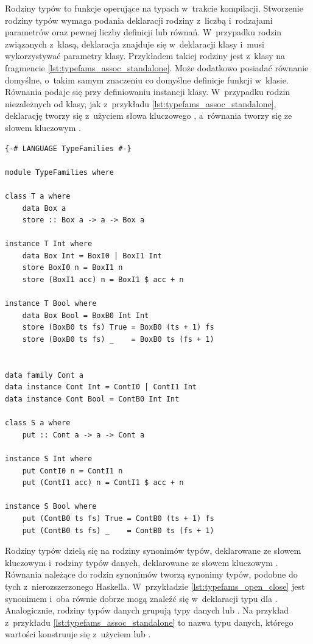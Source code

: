 \label{sec:rodziny_typow}

Rodziny typów to funkcje operujące na typach w~trakcie kompilacji.
Stworzenie rodziny typów wymaga podania deklaracji rodziny z~liczbą i~rodzajami
parametrów oraz pewnej liczby definicji lub równań. W~przypadku rodzin związanych
z~klasą, deklaracja znajduje się w~deklaracji klasy i~musi wykorzystywać parametry
klasy. Przykładem takiej rodziny jest  z~klasy  na
fragmencie \ref{lst:typefams_assoc_standalone}. Może dodatkowo
posiadać równanie domyślne, o~takim samym znaczeniu co domyślne definicje
funkcji w~klasie. Równania podaje się przy definiowaniu instancji klasy.
W~przypadku rodzin niezależnych od klasy, jak  z~przykładu
\ref{lst:typefams_assoc_standalone}, deklarację tworzy się z~użyciem słowa
kluczowego , a~równania tworzy się ze słowem kluczowym .

\begin{lstlisting}[float,label={lst:typefams_assoc_standalone},
                   caption={Przykład pozwiązanej z klasą i niezależnej rodziny typów.}]
{-# LANGUAGE TypeFamilies #-}

module TypeFamilies where

class T a where
    data Box a
    store :: Box a -> a -> Box a

instance T Int where
    data Box Int = BoxI0 | BoxI1 Int
    store BoxI0 n = BoxI1 n
    store (BoxI1 acc) n = BoxI1 $ acc + n

instance T Bool where
    data Box Bool = BoxB0 Int Int
    store (BoxB0 ts fs) True = BoxB0 (ts + 1) fs
    store (BoxB0 ts fs) _    = BoxB0 ts (fs + 1)


data family Cont a
data instance Cont Int = ContI0 | ContI1 Int
data instance Cont Bool = ContB0 Int Int

class S a where
    put :: Cont a -> a -> Cont a

instance S Int where
    put ContI0 n = ContI1 n
    put (ContI1 acc) n = ContI1 $ acc + n

instance S Bool where
    put (ContB0 ts fs) True = ContB0 (ts + 1) fs
    put (ContB0 ts fs) _    = ContB0 ts (fs + 1)
\end{lstlisting}

Rodziny typów dzielą się na rodziny synonimów typów, deklarowane ze słowem
kluczowym  i~rodziny typów danych, deklarowane ze słowem
kluczowym . Równania należące do rodzin synonimów tworzą synonimy typów,
podobne do tych z~nierozszerzonego Haskella. W~przykładzie \ref{lst:typefams_open_close}
 jest synonimem  i~oba równie dobrze mogą znaleźć
się w~deklaracji typu dla . Analogicznie, rodziny typów danych grupują
typy danych  lub . Na przykład  z~przykładu
\ref{lst:typefams_assoc_standalone} to nazwa typu danych, którego wartości konstruuje się
z~użyciem  lub .

